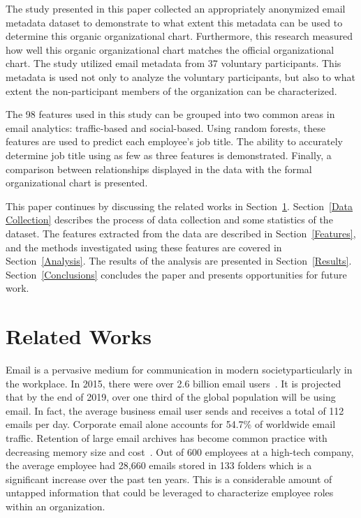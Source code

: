 \documentclass[10pt,twocolumn,conference]{IEEEtran}
\begin{document}
The study presented in this paper collected an appropriately anonymized email metadata dataset to demonstrate to what extent this metadata can be used to determine this organic organizational chart.  Furthermore, this research measured how well this organic organizational chart matches the official organizational chart.  The study utilized email metadata from 37 voluntary participants.  This metadata is used not only to analyze the voluntary participants, but also to what extent the non-participant members of the organization can be characterized.

The 98 features used in this study can be grouped into two common areas in email analytics: traffic-based and social-based. Using random forests, these features are used to predict each employee's job title.  The ability to accurately determine job title using as few as three features is demonstrated.  Finally, a comparison between relationships displayed in the data with the formal organizational chart is presented.  

This paper continues by discussing the related works in Section~\ref{Related Works}.  Section~\ref{Data Collection} describes the process of data collection and some statistics of the dataset.  The features extracted from the data are described in Section~\ref{Features}, and the methods investigated using these features are covered in Section~\ref{Analysis}.  The results of the analysis are presented in Section~\ref{Results}.  Section~\ref{Conclusions} concludes the paper and presents opportunities for future work.  

\section{Related Works} \label{Related Works}

Email is a pervasive medium for communication in modern society\textemdash{}particularly in the workplace.  In 2015, there were over 2.6 billion email users~\cite{radicati_emails_2015}.  It is projected that by the end of 2019, over one third of the global population will be using email.  In fact, the average business email user sends and receives a total of 112 emails per day.  Corporate email alone accounts for 54.7\% of worldwide email traffic. Retention of large email archives has become common practice with decreasing memory size and cost~\cite{fisher_revisiting_2006}.  Out of 600 employees at a high-tech company, the average employee had 28,660 emails stored in 133 folders which is a significant increase over the past ten years.  This is a considerable amount of untapped information that could be leveraged to characterize employee roles within an organization.
\end{document}
